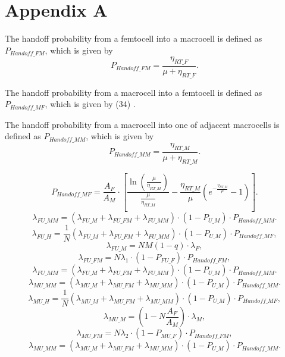 \documentclass[10pt,final,journal,letterpaper,twoside,twocolumn]{IEEEtran}
\begin{document}
\section*{Appendix A}
The handoff probability from a femtocell into a macrocell is
defined as ${P_{Handoff\_FM}}$, which is given by \cite{Zhang10}
\[{P_{Handoff\_FM}} = \frac{{{\eta _{RT\_F}}}}{{\mu  + {\eta _{RT\_F}}}}.\tag{33}\]

The handoff probability from a macrocell into a femtocell is defined as
${P_{Handoff\_MF}}$, which is given by (34) \cite{Zhang10}.

The handoff probability from a macrocell into one of adjacent macrocells is defined as
${P_{Handoff\_MM}}$, which is given by \cite{Zhang10}
\[{P_{Handoff\_MM}} = \frac{{{\eta _{RT\_M}}}}{{\mu  + {\eta _{RT\_M}}}}.\tag{35}\]
\begin{figure*}[!t]
\[{P_{Handoff\_MF}} = \frac{{{A_F}}}{{{A_M}}} \cdot \left[ {\frac{{\ln \left( {\frac{\mu }{{{\eta _{RT\_M}}}}} \right)}}{{\frac{\mu }{{{\eta _{RT\_M}}}}}} - \frac{{{\eta _{RT\_M}}}}{\mu }\left( {{e^{ - \frac{{{\eta _{RT\_M}}}}{\mu }}} - 1} \right)} \right].\tag{34}\]
\[{\lambda _{FU\_MM}} = \left( {{\lambda _{FU\_M}} + {\lambda _{FU\_FM}} + {\lambda _{FU\_MM}}} \right) \cdot \left( {1 - {P_{U\_M}}} \right) \cdot {P_{Handoff\_MM}}.\tag{38}\]
\[{\lambda _{FU\_H}} = \frac{1}{N}\left( {{\lambda _{FU\_M}} + {\lambda _{FU\_FM}} + {\lambda _{FU\_MM}}} \right) \cdot \left( {1 - {P_{U\_M}}} \right) \cdot {P_{Handoff\_MF}},\tag{39a}\]
\[{\lambda _{FU\_M}} = NM\left( {1 - q} \right) \cdot {\lambda _F},\tag{39b}\]
\[{\lambda _{FU\_FM}} = N{\lambda _1} \cdot \left( {1 - {P_{FU\_F}}} \right) \cdot {P_{Handoff\_FM}},\tag{39c}\]
\[{\lambda _{FU\_MM}} = \left( {{\lambda _{FU\_M}} + {\lambda _{FU\_FM}} + {\lambda _{FU\_MM}}} \right) \cdot \left( {1 - {P_{U\_M}}} \right) \cdot {P_{Handoff\_MM}}.\tag{39d}\]
\[{\lambda _{MU\_MM}} = \left( {{\lambda _{MU\_M}} + {\lambda _{MU\_FM}} + {\lambda _{MU\_MM}}} \right) \cdot \left( {1 - {P_{U\_M}}} \right) \cdot {P_{Handoff\_MM}}.\tag{42}\]
\[{\lambda _{MU\_H}} = \frac{1}{N}\left( {{\lambda _{MU\_M}} + {\lambda _{MU\_FM}} + {\lambda _{MU\_MM}}} \right) \cdot \left( {1 - {P_{U\_M}}} \right) \cdot {P_{Handoff\_MF}},\tag{43a}\]
\[{\lambda _{MU\_M}} = \left( {1 - N\frac{{{A_F}}}{{{A_M}}}} \right) \cdot {\lambda _M},\tag{43b}\]
\[{\lambda _{MU\_FM}} = N{\lambda _2} \cdot \left( {1 - {P_{MU\_F}}} \right) \cdot {P_{Handoff\_FM}},\tag{43c}\]
\[{\lambda _{MU\_MM}} = \left( {{\lambda _{MU\_M}} + {\lambda _{MU\_FM}} + {\lambda _{MU\_MM}}} \right) \cdot \left( {1 - {P_{U\_M}}} \right) \cdot {P_{Handoff\_MM}}.\tag{43d}\]
\end{figure*}
\end{document}
